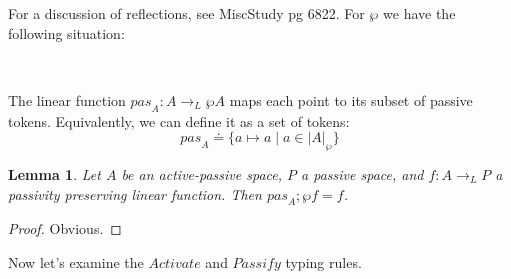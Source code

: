\documentclass{article}
\newtheorem{lemma}{Lemma}
\begin{document}
For a discussion of reflections, see MiscStudy pg 6822. For $\wp$ we have the following situation:

\begin{center}
\\
\end{center}

The linear function $\mathit{pas}_A : A \to_L \wp A$ maps each point to its subset of passive tokens.
Equivalently, we can define it as a set of tokens:
$$\mathit{pas}_A \doteq \{ a \mapsto a \mid a \in |A|_{\wp} \}$$

\begin{lemma}
Let $A$ be an active-passive space, $P$ a passive space, and $f : A \to_L P$ a passivity preserving linear function. Then $\mathit{pas}_A;\wp f = f$. 
\end{lemma}

\begin{proof}
Obvious.
\end{proof}

Now let's examine the $\mathit{Activate}$ and $\mathit{Passify}$ typing rules.

\end{document}
